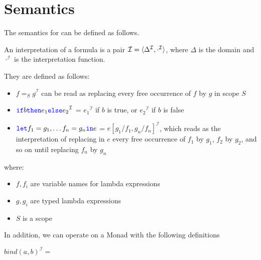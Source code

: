 \section{Semantics}

\newcommand{\I}[1]{\ensuremath{{#1}^{\mathcal{I}}}}

The semantics for \Soda can be defined as follows.


An interpretation of a \Soda formula is a pair $\mathcal{I} = \langle \Delta _\mathcal{\I} , \I{\cdot} \rangle$, where $\Delta$ is the domain and $\I{\cdot}$ is the interpretation function.

They are defined as follows:

\begin{itemize}
    \item $\I{f =_{S} g}$ can be read as replacing every free occurrence of $f$ by $g$ in scope $S$

    \item $\I{\sif b \sthen e_{1} \selse e_{2}}$ = \I{e_{1}} if $b$ is true, or \I{e_{2}} if $b$ is false

    \item ${\color{blue}\texttt{{let}}} f_{1} = g_{1}, \ldots f_{n} = g_{n} {\color{blue}\texttt{{in}}} e$ =
    \I{e[g_{1} / f_{1}, g_{n} / f_{n}]}, which reads as the interpretation of
    replacing in $e$ every free occurrence of $f_{1}$ by $g_{1}$, $f_{2}$ by $g_{2}$, and so on until replacing $f_{n}$ by $g_{n}$
\end{itemize}

where:
\begin{itemize}
    \item $f, f_{i}$ are variable names for lambda expressions
    \item $g, g_{i}$ are typed lambda expressions
    \item $S$ is a scope
\end{itemize}


In addition, we can operate on a Monad with the following definitions

$\I{bind(a, b)} = $



